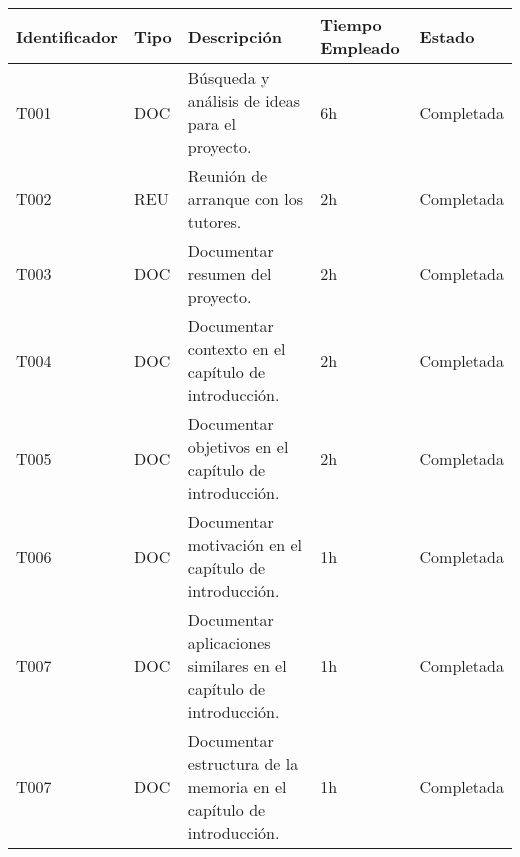 \begin{table}[]
  \centering
\begin{tabular}{
  |p{}%
  |p{}%
  |p{}
  |p{}
  |p{}
  |%
  }
  \hline
  \textbf{Identificador} & \textbf{Tipo} & \textbf{Descripción}                                             & \textbf{Tiempo Empleado} & \textbf{Estado} \\ \hline
  T001                   & DOC           & Búsqueda y análisis de ideas para el proyecto.                   & 6h                       & Completada      \\ \hline

  T002                   & REU           & Reunión de arranque con los tutores.                             & 2h                       & Completada      \\ \hline


  T003                   & DOC           & Documentar resumen del proyecto.                                  & 2h                       & Completada      \\ \hline

  

  T004                      & DOC           & Documentar contexto en el capítulo de introducción.               & 2h                     &    Completada             \\ \hline

  T005                      & DOC           & Documentar objetivos en el capítulo de introducción.              & 2h                     &   Completada              \\ \hline

  T006                      & DOC           & Documentar motivación en el capítulo de introducción.             & 1h                       &   Completada              \\ \hline

  T007                      & DOC           & Documentar aplicaciones similares en el capítulo de introducción. & 1h                       &   Completada              \\ \hline

  T007                      & DOC           & Documentar estructura de la memoria en el capítulo de introducción. & 1h                       &   Completada              \\ \hline











\end{tabular}
\end{table}
